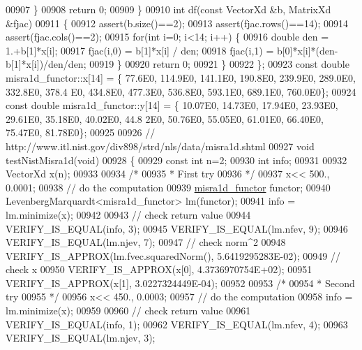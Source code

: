 \begin{DoxyCode}
00907         \}
00908         \textcolor{keywordflow}{return} 0;
00909     \}
00910     \textcolor{keywordtype}{int} df(\textcolor{keyword}{const} VectorXd &b, MatrixXd &fjac)
00911     \{
00912         assert(b.size()==2);
00913         assert(fjac.rows()==14);
00914         assert(fjac.cols()==2);
00915         \textcolor{keywordflow}{for}(\textcolor{keywordtype}{int} i=0; i<14; i++) \{
00916             \textcolor{keywordtype}{double} den = 1.+b[1]*x[i];
00917             fjac(i,0) = b[1]*x[i] / den;
00918             fjac(i,1) = b[0]*x[i]*(den-b[1]*x[i])/den/den;
00919         \}
00920         \textcolor{keywordflow}{return} 0;
00921     \}
00922 \};
00923 \textcolor{keyword}{const} \textcolor{keywordtype}{double} misra1d\_functor::x[14] = \{ 77.6E0, 114.9E0, 141.1E0, 190.8E0, 239.9E0, 289.0E0, 332.8E0, 378.4
      E0, 434.8E0, 477.3E0, 536.8E0, 593.1E0, 689.1E0, 760.0E0\};
00924 \textcolor{keyword}{const} \textcolor{keywordtype}{double} misra1d\_functor::y[14] = \{ 10.07E0, 14.73E0, 17.94E0, 23.93E0, 29.61E0, 35.18E0, 40.02E0, 44.8
      2E0, 50.76E0, 55.05E0, 61.01E0, 66.40E0, 75.47E0, 81.78E0\};
00925 
00926 \textcolor{comment}{// http://www.itl.nist.gov/div898/strd/nls/data/misra1d.shtml}
00927 \textcolor{keywordtype}{void} testNistMisra1d(\textcolor{keywordtype}{void})
00928 \{
00929   \textcolor{keyword}{const} \textcolor{keywordtype}{int} n=2;
00930   \textcolor{keywordtype}{int} info;
00931 
00932   VectorXd x(n);
00933 
00934   \textcolor{comment}{/*}
00935 \textcolor{comment}{   * First try}
00936 \textcolor{comment}{   */}
00937   x<< 500., 0.0001;
00938   \textcolor{comment}{// do the computation}
00939   \hyperlink{structmisra1d__functor}{misra1d\_functor} functor;
00940   LevenbergMarquardt<misra1d\_functor> lm(functor);
00941   info = lm.minimize(x);
00942 
00943   \textcolor{comment}{// check return value}
00944   VERIFY\_IS\_EQUAL(info, 3);
00945   VERIFY\_IS\_EQUAL(lm.nfev, 9);
00946   VERIFY\_IS\_EQUAL(lm.njev, 7);
00947   \textcolor{comment}{// check norm^2}
00948   VERIFY\_IS\_APPROX(lm.fvec.squaredNorm(), 5.6419295283E-02);
00949   \textcolor{comment}{// check x}
00950   VERIFY\_IS\_APPROX(x[0], 4.3736970754E+02);
00951   VERIFY\_IS\_APPROX(x[1], 3.0227324449E-04);
00952 
00953   \textcolor{comment}{/*}
00954 \textcolor{comment}{   * Second try}
00955 \textcolor{comment}{   */}
00956   x<< 450., 0.0003;
00957   \textcolor{comment}{// do the computation}
00958   info = lm.minimize(x);
00959 
00960   \textcolor{comment}{// check return value}
00961   VERIFY\_IS\_EQUAL(info, 1);
00962   VERIFY\_IS\_EQUAL(lm.nfev, 4);
00963   VERIFY\_IS\_EQUAL(lm.njev, 3);

\end{DoxyCode}
